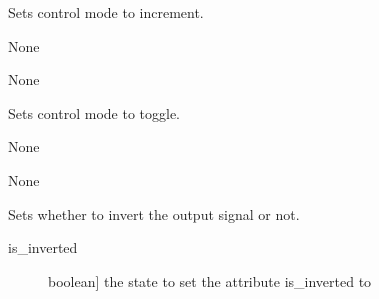 \documentclass[letterpaper,10pt,english]{sphinxmanual}
\begin{document}
\begin{fulllineitems}
\begin{fulllineitems}
\label{\detokenize{base:MultiInputOutputObject.MultiInputOutputObject.set_control_increment}}
\sphinxAtStartPar
Sets control mode to increment.

\sphinxAtStartPar
{}

\sphinxAtStartPar
None

\sphinxAtStartPar
{}

\sphinxAtStartPar
None

\end{fulllineitems}


\begin{fulllineitems}
\label{\detokenize{base:MultiInputOutputObject.MultiInputOutputObject.set_control_toggle}}
\sphinxAtStartPar
Sets control mode to toggle.

\sphinxAtStartPar
{}

\sphinxAtStartPar
None

\sphinxAtStartPar
{}

\sphinxAtStartPar
None

\end{fulllineitems}


\begin{fulllineitems}
\label{\detokenize{base:MultiInputOutputObject.MultiInputOutputObject.set_inversion}}
\sphinxAtStartPar
Sets whether to invert the output signal or not.

\sphinxAtStartPar
{}
\begin{description}
\item[{is\_inverted}] \leavevmode{[}boolean{]}
\sphinxAtStartPar
the state to set the attribute is\_inverted to


\end{description}
\end{fulllineitems}
\end{fulllineitems}
\end{document}
